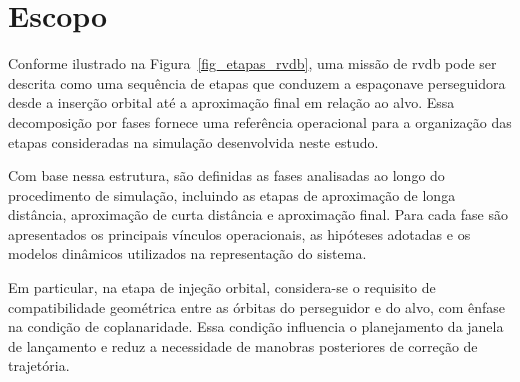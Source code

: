 \section{Escopo}
\label{sec_Escopo}


Conforme ilustrado na Figura~\ref{fig_etapas_rvdb}, uma missão de \gls{rvdb} pode ser descrita como uma sequência de etapas que conduzem a espaçonave perseguidora desde a inserção orbital até a aproximação final em relação ao alvo. 
Essa decomposição por fases fornece uma referência operacional para a organização das etapas consideradas na simulação desenvolvida neste estudo.

Com base nessa estrutura, são definidas as fases analisadas ao longo do procedimento de simulação, incluindo as etapas de aproximação de longa distância, aproximação de curta distância e aproximação final. 
Para cada fase são apresentados os principais vínculos operacionais, as hipóteses adotadas e os modelos dinâmicos utilizados na representação do sistema.

Em particular, na etapa de injeção orbital, considera-se o requisito de compatibilidade geométrica entre as órbitas do perseguidor e do alvo, com ênfase na condição de coplanaridade. 
Essa condição influencia o planejamento da janela de lançamento e reduz a necessidade de manobras posteriores de correção de trajetória.
